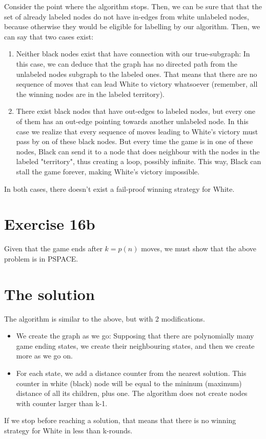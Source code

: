 Consider the point where the algorithm stops. Then, we can be sure that that the 
set of already labeled nodes do not have in-edges from white unlabeled nodes, 
because otherwise they would be eligible for labelling by our algorithm. 
Then, we can say that two cases exist:
\begin{enumerate}
\item Neither black nodes exist that have connection with our true-subgraph:
In this case, we can deduce that the graph has no directed path from the 
unlabeled nodes subgraph to the labeled ones. That means that there are no 
sequence of moves that can lead White to victory whatsoever (remember, all
the winning nodes are in the labeled territory).
\item There exist black nodes that have out-edges to labeled nodes, but every
one of them has an out-edge pointing towards another unlabeled node. In this case we realize that every sequence of moves leading to White's victory must
pass by on of these black nodes. But every time the game is in one of these
nodes, Black can send it to a node that does neighbour with the nodes in the
labeled "territory", thus creating a loop, possibly infinite. This way, Black 
can stall the game forever, making White's victory impossible. 
\end{enumerate}

In both cases, there doesn't exist a fail-proof winning strategy for White.



\section*{Exercise 16b}

Given that the game ends after $k=p(n)$ moves, we must show that the above problem
is in PSPACE.

\section*{The solution}

The algorithm is similar to the above, but with 2 modifications.

\begin{itemize}
\item We create the graph as we go: Supposing that there are polynomially many
game ending states, we create their neighbouring states, and then we create
more as we go on.
\item For each state, we add a distance counter from the nearest solution. This counter in white (black) node will be equal to the mininum (maximum) distance of all its children, plus one. The algorithm does not create nodes with counter larger than k-1.
\end{itemize}
If we stop before reaching a solution, that means that there is no winning 
strategy for White in less than k-rounds.

